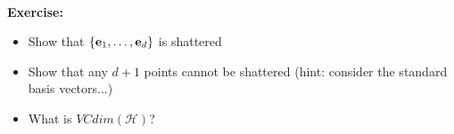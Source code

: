 \documentclass[11pt]{article}
\newcommand{\Hc}{\mathcal{H}}
\begin{document}
~\\{\bf Exercise:}
\begin{itemize}
\item Show that $\{{\mathbf e}_1,\ldots,{\mathbf e}_d\}$ is shattered
\item Show that any $d+1$ points cannot be shattered (hint: consider the standard basis vectors...)
\item What is $VCdim(\Hc)$?
\end{itemize}

\end{document}
